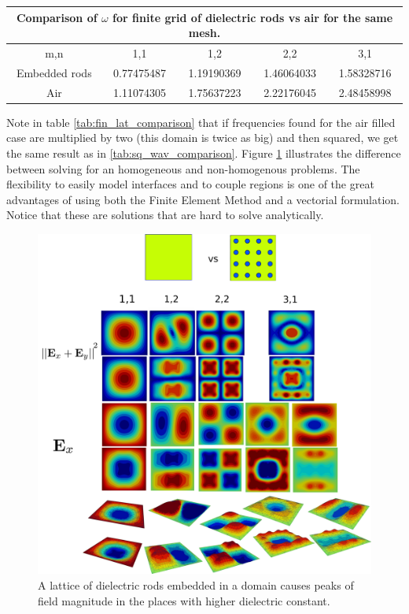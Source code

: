 \begin{center}
\begin{tabular}{|c|c|c|c|c|}
\hline
\multicolumn{5}{|c|}{Comparison of $\omega$ for finite grid of dielectric rods vs air for the same mesh.} \\
\hline 
m,n & 1,1 & 1,2 & 2,2 & 3,1 \\ 
\hline 
Embedded rods & 0.77475487 & 1.19190369 & 1.46064033 & 1.58328716 \\ 
\hline 
Air  & 1.11074305 & 1.75637223 & 2.22176045 & 2.48458998 \\ 
\hline 
\end{tabular}
\label{tab:fin_lat_comparison}
\end{center}

Note in table \ref{tab:fin_lat_comparison} that if frequencies found for the air filled case are multiplied by two (this domain is twice as big) and then squared, we get the same result as in \ref{tab:sq_wav_comparison}. 
Figure \ref{fig:fin_lat_waveguide} illustrates the difference between solving for an homogeneous and non-homogenous problems. The flexibility to easily model interfaces and to couple regions is one of the great advantages of using both the Finite Element Method and a vectorial formulation. Notice that these are solutions that are hard to solve analytically.

\begin{figure}
\centering
\includegraphics[scale=0.1]{./img/finite_lattice.pdf}
\caption{A lattice of dielectric rods embedded in a domain causes peaks of field magnitude in the places with higher dielectric constant.}
\label{fig:fin_lat_waveguide}
\end{figure}

